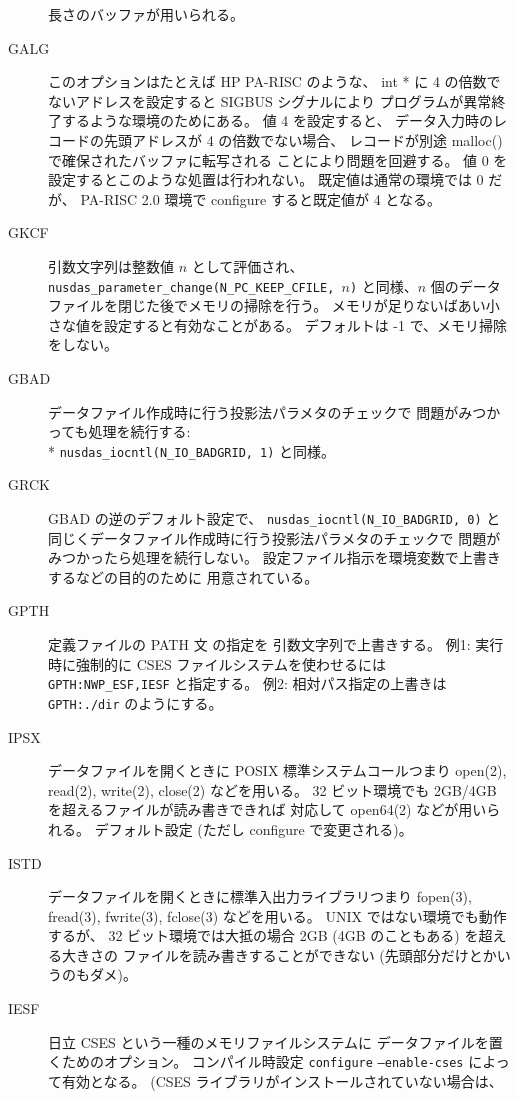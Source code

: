 \begin{description}
	長さのバッファが用いられる。
\item[GALG]
	このオプションはたとえば HP PA-RISC のような、
	int * に 4 の倍数でないアドレスを設定すると SIGBUS シグナルにより
	プログラムが異常終了するような環境のためにある。
	値 4 を設定すると、
	データ入力時のレコードの先頭アドレスが 4 の倍数でない場合、
	レコードが別途 malloc() で確保されたバッファに転写される
	ことにより問題を回避する。
	値 0 を設定するとこのような処置は行われない。
	既定値は通常の環境では 0 だが、
	PA-RISC 2.0 環境で configure すると既定値が 4 となる。
\item[GKCF]
	引数文字列は整数値 $n$ として評価され、
	{\tt nusdas\_parameter\_change(N\_PC\_KEEP\_CFILE, }$n${\tt )}
	と同様、$n$ 個のデータファイルを閉じた後でメモリの掃除を行う。
	メモリが足りないばあい小さな値を設定すると有効なことがある。
	デフォルトは -1 で、メモリ掃除をしない。
\item[GBAD]
	データファイル作成時に行う投影法パラメタのチェックで
	問題がみつかっても処理を続行する: \\*
	\verb|nusdas_iocntl(N_IO_BADGRID, 1)|
	と同様。
\item[GRCK]
	GBAD の逆のデフォルト設定で、
	\verb|nusdas_iocntl(N_IO_BADGRID, 0)|
	と同じくデータファイル作成時に行う投影法パラメタのチェックで
	問題がみつかったら処理を続行しない。
	設定ファイル指示を環境変数で上書きするなどの目的のために
	用意されている。
\item[GPTH]
	定義ファイルの PATH 文  の指定を
	引数文字列で上書きする。
	例1: 実行時に強制的に CSES ファイルシステムを使わせるには
	{\tt GPTH:NWP\_ESF,IESF} と指定する。
	例2: 相対パス指定の上書きは {\tt GPTH:./dir} のようにする。
\item[IPSX]
	データファイルを開くときに POSIX 標準システムコールつまり
	open(2), read(2), write(2), close(2) などを用いる。
	32 ビット環境でも 2GB/4GB を超えるファイルが読み書きできれば
	対応して open64(2) などが用いられる。
	デフォルト設定 (ただし configure で変更される)。
\item[ISTD]
	データファイルを開くときに標準入出力ライブラリつまり
	fopen(3), fread(3), fwrite(3), fclose(3) などを用いる。
	UNIX ではない環境でも動作するが、
	32 ビット環境では大抵の場合 2GB (4GB のこともある) を超える大きさの
	ファイルを読み書きすることができない (先頭部分だけとかいうのもダメ)。
\item[IESF]
	日立 CSES という一種のメモリファイルシステムに
	データファイルを置くためのオプション。
	コンパイル時設定 {\tt configure} {\tt --enable-cses}
	によって有効となる。
	(CSES ライブラリがインストールされていない場合は、

\end{description}
